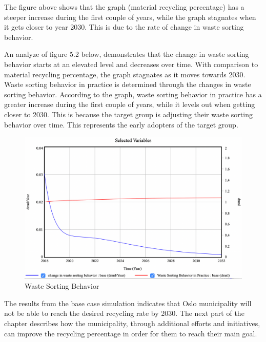 \indent \newline
The figure above shows that the graph (material recycling percentage) has a steeper increase during the first couple of years, while the graph stagnates when it gets closer to year 2030. This is due to the rate of change in waste sorting behavior. 

\indent \newline
An analyze of figure 5.2 below, demonstrates that the change in waste sorting behavior starts at an elevated level and decreases over time. With comparison to material recycling percentage, the graph stagnates as it moves towards 2030. Waste sorting behavior in practice is determined through the changes in waste sorting behavior. According to the graph, waste sorting behavior in practice has a greater increase during the first couple of years, while it levels out when getting closer to 2030. This is because the target group is adjusting their waste sorting behavior over time. This represents the early adopters of the target group. 

\begin{figure}[H]
\centering
\includegraphics [scale=0.26,angle=360]{figures/basecase2.png}
\caption{Waste Sorting Behavior}
\label{fig:basecase2}
\end{figure}

\indent \newline
The results from the base case simulation indicates that Oslo municipality will not be able to reach the desired recycling rate by 2030. The next part of the chapter describes how the municipality, through additional efforts and initiatives, can improve the recycling percentage in order for them to reach their main goal. 

